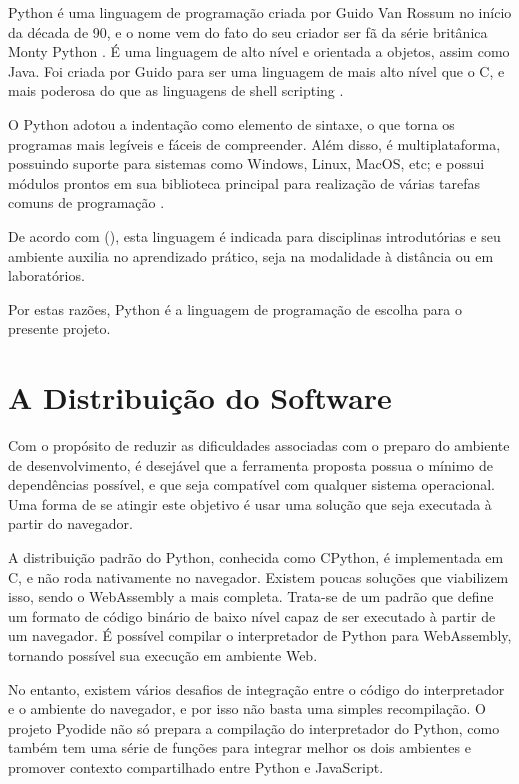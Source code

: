 Python é uma linguagem de programação criada por Guido Van Rossum no início da década de 90, e o nome vem do fato do seu criador ser fã da série britânica Monty Python \cite{moraispires2002}. É uma linguagem de alto nível e orientada a objetos, assim como Java. Foi criada por Guido para ser uma linguagem de mais alto nível que o C, e mais poderosa do que as linguagens de shell scripting \cite{moraispires2002}.
	
O Python adotou a indentação como elemento de sintaxe, o que torna os programas mais legíveis e fáceis de compreender. Além disso, é multiplataforma, possuindo suporte para sistemas como Windows, Linux, MacOS, etc; e possui módulos prontos em sua biblioteca principal para realização de várias tarefas comuns de programação \cite{moraispires2002}.

De acordo com \citeauthor{fangohr2004} (\citeyear{fangohr2004}), esta linguagem é indicada para disciplinas introdutórias e seu ambiente auxilia no aprendizado prático, seja na modalidade à distância ou em laboratórios. 

Por estas razões, Python é a linguagem de programação de escolha para o presente projeto.

\section{A Distribuição do Software}

Com o propósito de reduzir as dificuldades associadas com o preparo do ambiente de desenvolvimento, é desejável que a ferramenta proposta possua o mínimo de dependências possível, e que seja compatível com qualquer sistema operacional. Uma forma de se atingir este objetivo é usar uma solução que seja executada à partir do navegador.

A distribuição padrão do Python, conhecida como CPython, é implementada em C, e não roda nativamente no navegador. Existem poucas soluções que viabilizem isso, sendo o WebAssembly a mais completa. Trata-se de um padrão que define um formato de código binário de baixo nível capaz de ser executado à partir de um navegador. É possível compilar o interpretador de Python para WebAssembly, tornando possível sua execução em ambiente Web.

No entanto, existem vários desafios de integração entre o código do interpretador e o ambiente do navegador, e por isso não basta uma simples recompilação. O projeto Pyodide não só prepara a compilação do interpretador do Python, como também tem uma série de funções para integrar melhor os dois ambientes e promover contexto compartilhado entre Python e JavaScript.

